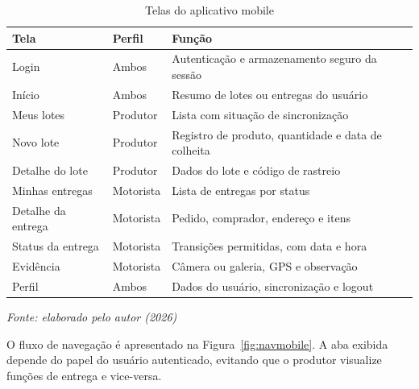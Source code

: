 \begin{table}[H]
  \centering
  \caption{Telas do aplicativo mobile}
  \label{tab:telasmobile}
  \fontsize{9.5}{11.5}\selectfont
  \begin{tabular}{L{3.4cm}L{3.0cm}L{8.6cm}}
    \toprule
    \textbf{Tela} & \textbf{Perfil} & \textbf{Função} \\
    \midrule
    Login & Ambos & Autenticação e armazenamento seguro da sessão \\
    Início & Ambos & Resumo de lotes ou entregas do usuário \\
    Meus lotes & Produtor & Lista com situação de sincronização \\
    Novo lote & Produtor & Registro de produto, quantidade e data de colheita \\
    Detalhe do lote & Produtor & Dados do lote e código de rastreio \\
    Minhas entregas & Motorista & Lista de entregas por status \\
    Detalhe da entrega & Motorista & Pedido, comprador, endereço e itens \\
    Status da entrega & Motorista & Transições permitidas, com data e hora \\
    Evidência & Motorista & Câmera ou galeria, GPS e observação \\
    Perfil & Ambos & Dados do usuário, sincronização e logout \\
    \bottomrule
  \end{tabular}

  \vspace{2pt}
  {\fontsize{10}{12}\selectfont\itshape Fonte: elaborado pelo autor (2026)}
\end{table}

O fluxo de navegação é apresentado na Figura~\ref{fig:navmobile}. A aba exibida
depende do papel do usuário autenticado, evitando que o produtor visualize
funções de entrega e vice-versa.

